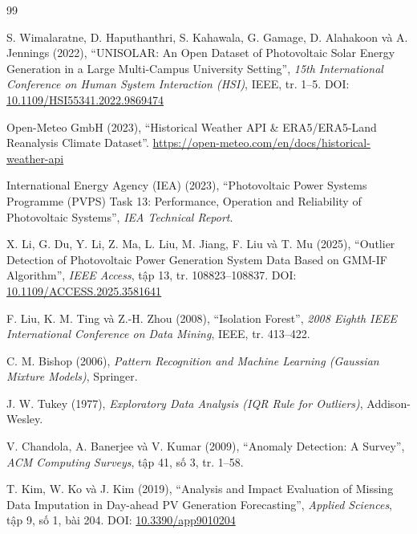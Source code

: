 \documentclass[12pt, a4paper]{report}
\begin{document}
\pagestyle{main}

\begin{thebibliography}{99}

S. Wimalaratne, D. Haputhanthri, S. Kahawala, G. Gamage, D. Alahakoon và A. Jennings (2022),
``UNISOLAR: An Open Dataset of Photovoltaic Solar Energy Generation in a Large Multi-Campus University Setting'',
\textit{15th International Conference on Human System Interaction (HSI)}, IEEE, tr. 1--5.
DOI: \href{https://doi.org/10.1109/HSI55341.2022.9869474}{10.1109/HSI55341.2022.9869474}

Open-Meteo GmbH (2023),
``Historical Weather API \& ERA5/ERA5-Land Reanalysis Climate Dataset''.
\url{https://open-meteo.com/en/docs/historical-weather-api}

International Energy Agency (IEA) (2023),
``Photovoltaic Power Systems Programme (PVPS) Task 13: Performance, Operation and Reliability of Photovoltaic Systems'',
\textit{IEA Technical Report}.

X. Li, G. Du, Y. Li, Z. Ma, L. Liu, M. Jiang, F. Liu và T. Mu (2025),
``Outlier Detection of Photovoltaic Power Generation System Data Based on GMM-IF Algorithm'',
\textit{IEEE Access}, tập 13, tr. 108823--108837.
DOI: \href{https://doi.org/10.1109/ACCESS.2025.3581641}{10.1109/ACCESS.2025.3581641}

F. Liu, K. M. Ting và Z.-H. Zhou (2008),
``Isolation Forest'',
\textit{2008 Eighth IEEE International Conference on Data Mining}, IEEE, tr. 413--422.

C. M. Bishop (2006),
\textit{Pattern Recognition and Machine Learning (Gaussian Mixture Models)}, Springer.

J. W. Tukey (1977),
\textit{Exploratory Data Analysis (IQR Rule for Outliers)}, Addison-Wesley.

V. Chandola, A. Banerjee và V. Kumar (2009),
``Anomaly Detection: A Survey'',
\textit{ACM Computing Surveys}, tập 41, số 3, tr. 1--58.

T. Kim, W. Ko và J. Kim (2019),
``Analysis and Impact Evaluation of Missing Data Imputation in Day-ahead PV Generation Forecasting'',
\textit{Applied Sciences}, tập 9, số 1, bài 204.
DOI: \href{https://doi.org/10.3390/app9010204}{10.3390/app9010204}


\end{thebibliography}
\end{document}
